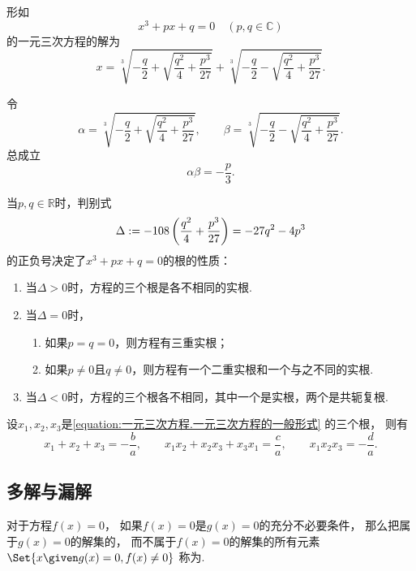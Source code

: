 \begin{theorem}[卡丹公式]
\def\a{-\frac{q}{2}}%
\def\d{\frac{q^2}{4}+\frac{p^3}{27}}
\def\b{\sqrt{\d}}%
\def\c#1{\sqrt[3]{\a#1\b}}%
形如\begin{equation*}
	x^3 + px + q = 0 \quad (p,q \in \mathbb{C})
\end{equation*}的一元三次方程的解为\begin{equation*}
	x = \c{+}+\c{-}.
\end{equation*}

令\begin{equation*}
	\alpha=\c{+}, \qquad \beta=\c{-}.
\end{equation*}
总成立\begin{equation*}
	\alpha \beta = -\frac{p}{3}.
\end{equation*}

当\(p,q\in\mathbb{R}\)时，判别式\begin{equation*}
	\Delta \defeq -108\left(\d\right) = -27q^2-4p^3
\end{equation*}的正负号决定了\(x^3+px+q=0\)的根的性质：\begin{enumerate}
	\item 当\(\Delta>0\)时，方程的三个根是各不相同的实根.
	\item 当\(\Delta=0\)时，\begin{enumerate}
		\item 如果\(p=q=0\)，则方程有三重实根；
		\item 如果\(p\neq0\)且\(q\neq0\)，则方程有一个二重实根和一个与之不同的实根.
		\end{enumerate}
	\item 当\(\Delta<0\)时，方程的三个根各不相同，其中一个是实根，两个是共轭复根.
\end{enumerate}
\end{theorem}

\begin{theorem}[韦达定理]\label{theorem:一元三次方程.韦达定理}
设\(x_1,x_2,x_3\)是\cref{equation:一元三次方程.一元三次方程的一般形式} 的三个根，
则有\begin{equation*}
	x_1 + x_2 + x_3 = -\frac{b}{a},
	\qquad
	x_1 x_2 + x_2 x_3 + x_3 x_1 = \frac{c}{a},
	\qquad
	x_1 x_2 x_3 = -\frac{d}{a}.
\end{equation*}
\end{theorem}

\subsection{多解与漏解}
对于方程\(f(x) = 0\)，
如果\(f(x) = 0\)是\(g(x) = 0\)的充分不必要条件，
那么把属于\(g(x) = 0\)的解集的，
而不属于\(f(x) = 0\)的解集的所有元素
\(\Set{ x \given g(x) = 0, f(x) \neq 0 }\)
称为.

